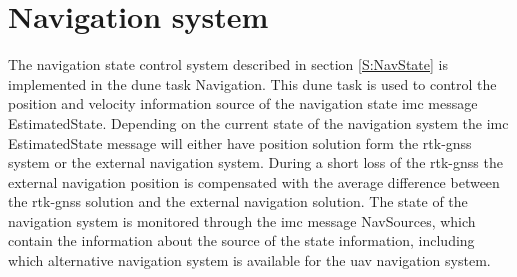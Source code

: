 \section{Navigation system}\label{IMP:NavSys}
The navigation state control system described in section \ref{S:NavState} is implemented in the \gls{dune} task Navigation. This \gls{dune} task is used to control the position and velocity information source of the navigation state \gls{imc} message EstimatedState. Depending on the current state of the navigation system the \gls{imc} EstimatedState message will either have position solution form the \gls{rtk-gnss} system or the external navigation system. During a short loss of the \gls{rtk-gnss} the external navigation position is compensated with the average difference between the \gls{rtk-gnss} solution and the external navigation solution. The state of the navigation system is monitored through the \gls{imc} message NavSources, which contain the information about the source of the state information, including which alternative navigation system is available for the \gls{uav} navigation system.
